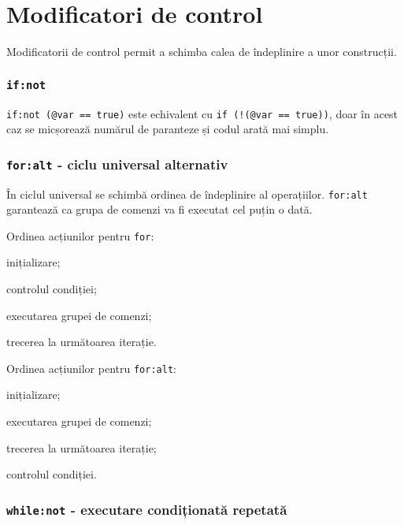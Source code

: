 
\section{Modificatori de control}

\label{sec-modifiers}

Modificatorii de control permit a schimba calea de îndeplinire a unor construcții.

\subsubsection{\texttt{if:not}}

\texttt{if:not (@var == true)} este echivalent cu \texttt{if (!(@var == true))}, doar în acest caz se micșorează numărul de paranteze și codul arată mai simplu.

\subsubsection{\texttt{for:alt} - ciclu universal alternativ}

În ciclul universal se schimbă ordinea de îndeplinire al operațiilor. \texttt{for:alt} garantează ca grupa de comenzi va fi executat cel puțin o dată.

Ordinea acțiunilor pentru \texttt{for}:
\begin{icEnum}
    \item inițializare;
	\item controlul condiției;
	\item executarea grupei de comenzi;
	\item trecerea la următoarea iterație.
\end{icEnum}

Ordinea acțiunilor pentru \texttt{for:alt}:
\begin{icEnum}
    \item inițializare;
	\item executarea grupei de comenzi;
	\item trecerea la următoarea iterație;
	\item controlul condiției.
\end{icEnum}

\subsubsection{\texttt{while:not} - executare condiționată repetată}


